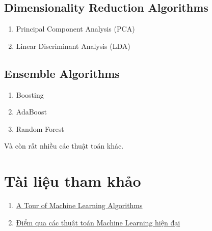 \subsection{Dimensionality Reduction Algorithms }
\begin{enumerate}
  \item Principal Component Analysis (PCA) 

  \item Linear Discriminant Analysis (LDA) 
 
\end{enumerate}
 
\subsection{Ensemble Algorithms }
 \begin{enumerate}
   \item Boosting 

   \item AdaBoost  

  \item Random Forest  
 \end{enumerate}
 
Và còn rất nhiều các thuật toán khác.  
 
 
\section{Tài liệu tham khảo }
\begin{enumerate}
  \item \href{http://machinelearningmastery.com/a-tour-of-machine-learning-algorithms/}{A Tour of Machine Learning Algorithms} 
  
  \item \href{https://ongxuanhong.wordpress.com/2015/10/22/diem-qua-cac-thuat-toan-machine-learning-hien-dai/}{Điểm qua các thuật toán Machine Learning hiện đại} 
 
 
\end{enumerate}
